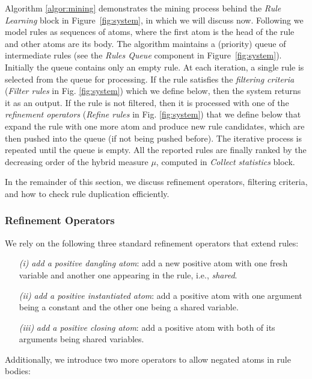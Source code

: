 Algorithm \ref{algor:mining} demonstrates the mining process behind the \emph{Rule Learning} block in Figure~\ref{fig:system}, in which we will discuss now. Following \cite{amie} we model rules as sequences of atoms, where the first atom is the head of the rule and other atoms are its body. The algorithm maintains a (priority) queue of intermediate rules (see the \emph{Rules Queue} component in Figure~\ref{fig:system}). 
Initially the queue contains only an empty rule. At each iteration, a single rule is selected from the queue for processing. If the rule satisfies the \emph{filtering criteria} (\emph{Filter rules} in Fig. \ref{fig:system}) which we define below, then the system returns it as an output. If the rule is not filtered, then it is processed with one of the \emph{refinement operators} (\emph{Refine rules} in Fig. \ref{fig:system}) 
that we define below that expand the rule with one more atom and produce new rule candidates, which are then pushed into the queue (if not being pushed before). The iterative process is repeated until the queue is empty. All the reported rules are finally ranked by the decreasing order of the hybrid measure $\mu$, computed in \emph{Collect statistics} block.

In the remainder of this section, we discuss refinement operators, filtering criteria, and how to check rule duplication efficiently.

\subsubsection{Refinement Operators}
We rely on the following three standard refinement operators \cite{amie}
that extend rules:
\begin{enumerate}
\item[\it (i)] \textit{add a positive dangling atom}: add a new positive atom with one fresh variable and another one appearing in the rule, i.e., \emph{shared}.
\item[\it (ii)] \textit{add a positive instantiated atom}: add a positive atom with one argument being a constant and the other one being a shared variable.
\item[\it (iii)] \textit{add a positive closing atom}: add a positive atom with both of its arguments being shared variables.
\end{enumerate}

Additionally, we introduce two more operators to allow negated atoms in rule bodies: 

